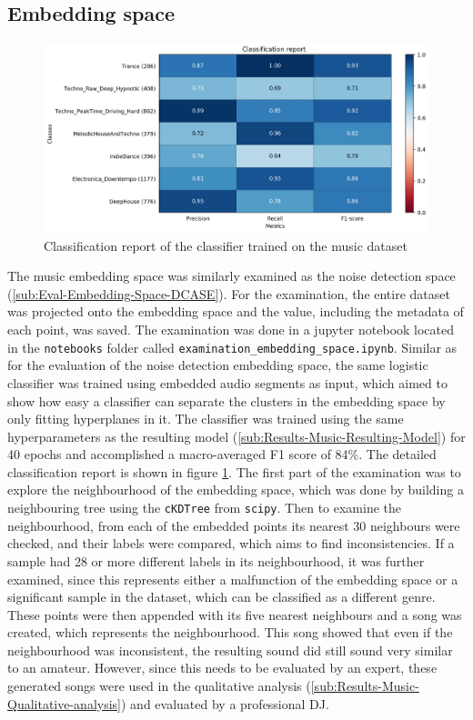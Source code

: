 \subsection{Embedding space}
\label{sub:Results-Music-Embedding-Space}
\begin{figure}[ht]
\centering
    \includegraphics[width=0.9\linewidth]{img/music_plot_classif_report.png}
    \caption{Classification report of the classifier trained on the music dataset}
    \label{fig:Classification-Report-Muisc}
\end{figure}
\noindent
The music embedding space was similarly examined as the noise detection space (\ref{sub:Eval-Embedding-Space-DCASE}). For the examination, the entire dataset was projected onto the embedding space and the value, including the metadata of each point, was saved. The examination was done in a jupyter notebook located in the \texttt{notebooks} folder called \texttt{examination\_embedding\_space.ipynb}.
\newline
\newline
Similar as for the evaluation of the noise detection embedding space, the same logistic classifier was trained using embedded audio segments as input, which aimed to show how easy a classifier can separate the clusters in the embedding space by only fitting hyperplanes in it. The classifier was trained using the same hyperparameters as the resulting model (\ref{sub:Results-Music-Resulting-Model}) for 40 epochs and accomplished a macro-averaged F1 score of 84\%. The detailed classification report is shown in figure \ref{fig:Classification-Report-Muisc}.
\newline
\newline
The first part of the examination was to explore the neighbourhood of the embedding space, which was done by building a neighbouring tree using the \texttt{cKDTree} from \texttt{scipy}. Then to examine the neighbourhood, from each of the embedded points its nearest 30 neighbours were checked, and their labels were compared, which aims to find inconsistencies. If a sample had 28 or more different labels in its neighbourhood, it was further examined, since this represents either a malfunction of the embedding space or a significant sample in the dataset, which can be classified as a different genre. These points were then appended with its five nearest neighbours and a song was created, which represents the neighbourhood. This song showed that even if the neighbourhood was inconsistent, the resulting sound did still sound very similar to an amateur. However, since this needs to be evaluated by an expert, these generated songs were used in the qualitative analysis (\ref{sub:Results-Music-Qualitative-analysis}) and evaluated by a professional DJ.
